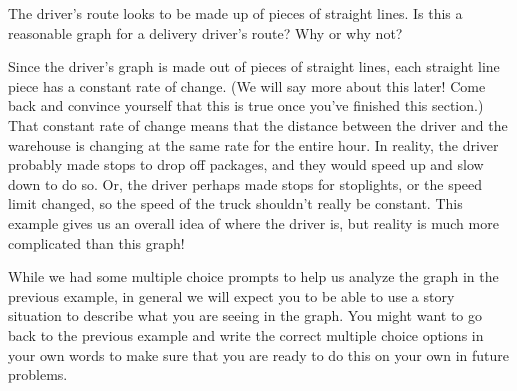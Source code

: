 \documentclass{ximera}
\begin{document}
\begin{example}
The driver's route looks to be made up of pieces of straight lines. Is this a reasonable graph for a delivery driver's route? Why or why not?
\begin{multipleChoice}
\begin{feedback}[correct]
Since the driver's graph is made out of pieces of straight lines, each straight line piece has a constant rate of change. (We will say more about this later! Come back and convince yourself that this is true once you've finished this section.) That constant rate of change means that the distance between the driver and the warehouse is changing at the same rate for the entire hour. In reality, the driver probably made stops to drop off packages, and they would speed up and slow down to do so. Or, the driver perhaps made stops for stoplights, or the speed limit changed, so the speed of the truck shouldn't really be constant. This example gives us an overall idea of where the driver is, but reality is much more complicated than this graph!
\end{feedback}
\end{multipleChoice}

\end{example}


While we had some multiple choice prompts to help us analyze the graph in the previous example, in general we will expect you to be able to use a story situation to describe what you are seeing in the graph. You might want to go back to the previous example and write the correct multiple choice options in your own words to make sure that you are ready to do this on your own in future problems.
\end{document}
